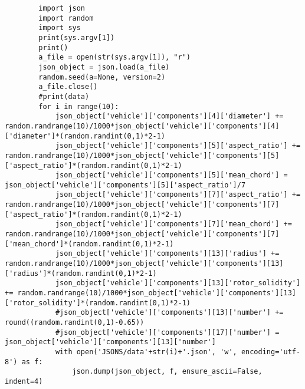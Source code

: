 \vspace{5pt}
\FloatBarrier

    \begin{minipage}{\textwidth}
        \begin{verbatim}
        import json
        import random
        import sys
        print(sys.argv[1])
        print()
        a_file = open(str(sys.argv[1]), "r")
        json_object = json.load(a_file)
        random.seed(a=None, version=2)
        a_file.close()
        #print(data)
        for i in range(10):
            json_object['vehicle']['components'][4]['diameter'] += random.randrange(10)/1000*json_object['vehicle']['components'][4]['diameter']*(random.randint(0,1)*2-1)
            json_object['vehicle']['components'][5]['aspect_ratio'] += random.randrange(10)/1000*json_object['vehicle']['components'][5]['aspect_ratio']*(random.randint(0,1)*2-1)
            json_object['vehicle']['components'][5]['mean_chord'] = json_object['vehicle']['components'][5]['aspect_ratio']/7
            json_object['vehicle']['components'][7]['aspect_ratio'] += random.randrange(10)/1000*json_object['vehicle']['components'][7]['aspect_ratio']*(random.randint(0,1)*2-1)
            json_object['vehicle']['components'][7]['mean_chord'] += random.randrange(10)/1000*json_object['vehicle']['components'][7]['mean_chord']*(random.randint(0,1)*2-1)
            json_object['vehicle']['components'][13]['radius'] += random.randrange(10)/1000*json_object['vehicle']['components'][13]['radius']*(random.randint(0,1)*2-1)
            json_object['vehicle']['components'][13]['rotor_solidity'] += random.randrange(10)/1000*json_object['vehicle']['components'][13]['rotor_solidity']*(random.randint(0,1)*2-1)
            #json_object['vehicle']['components'][13]['number'] += round((random.randint(0,1)-0.65))
            #json_object['vehicle']['components'][17]['number'] = json_object['vehicle']['components'][13]['number']
            with open('JSONS/data'+str(i)+'.json', 'w', encoding='utf-8') as f:
                json.dump(json_object, f, ensure_ascii=False, indent=4)
        \end{verbatim}
    \end{minipage}
